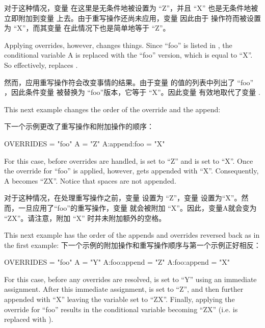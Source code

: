 对于这种情况，变量  在这里是无条件地被设置为 ``Z''，并且 ``X'' 也是无条件地被立即附加到变量  上去。由于重写操作还尚未应用，变量  因此由于  操作符而被设置为 ``X''，而其变量  在此情况下也是简单地等于 ``Z''。

Applying overrides, however, changes things. Since ``foo'' is listed in , the conditional variable A is replaced with the ``foo'' version, which is equal to ``X''. So effectively,  replaces .

然而，应用重写操作符会改变事情的结果。由于变量  的值的列表中列出了 ``foo'' ，因此条件变量  被替换为 ``foo''版本，它等于 ``X''。因此变量  有效地取代了变量 .

This next example changes the order of the override and the append:

下一个示例更改了重写操作和附加操作的顺序：

\begin{pyglist}
OVERRIDES = "foo"
A = "Z"
A:append:foo = "X"
\end{pyglist}

For this case, before overrides are handled,  is set to ``Z'' and  is set to ``X''. Once the override for ``foo'' is applied, however,  gets appended with ``X''. Consequently, A becomes ``ZX''. Notice that spaces are not appended.

对于这种情况，在处理重写操作之前，变量  设置为 ``Z''，变量  设置为``X''。然而，一旦应用了``foo''的重写操作，变量  就会被附加 ``X''。因此，变量A就会变为 ``ZX''。请注意，附加 ``X'' 时并未附加额外的空格。

This next example has the order of the appends and overrides reversed back as in the first example:
下一个示例的附加操作和重写操作顺序与第一个示例正好相反：

\begin{pyglist}
OVERRIDES = "foo"
A = "Y"
A:foo:append = "Z"
A:foo:append = "X"
\end{pyglist}

For this case, before any overrides are resolved,  is set to ``Y'' using an immediate assignment. After this immediate assignment,  is set to ``Z'', and then further appended with ``X'' leaving the variable set to ``ZX''. Finally, applying the override for ``foo'' results in the conditional variable  becoming ``ZX'' (i.e.  is replaced with ).

